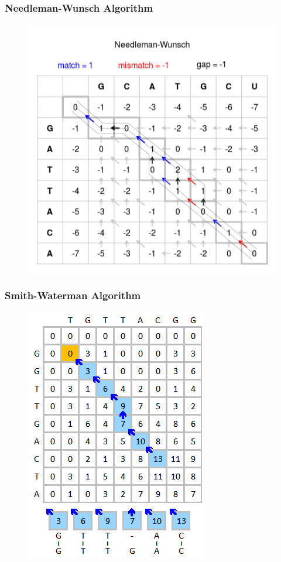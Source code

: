 \documentclass[presentation]{beamer}
\newlength{\slideheight}
\begin{document}
\begin{frame}
\frametitle{Needleman-Wunsch Algorithm}
\begin{figure}
\includegraphics[height=\slideheight]{figs/png/needleman-wunsch}
\end{figure}
\end{frame}

\begin{frame}
\frametitle{Smith-Waterman Algorithm}
\begin{figure}
\includegraphics[height=\slideheight]{figs/png/smith-waterman}
\end{figure}
\end{frame}
\end{document}
